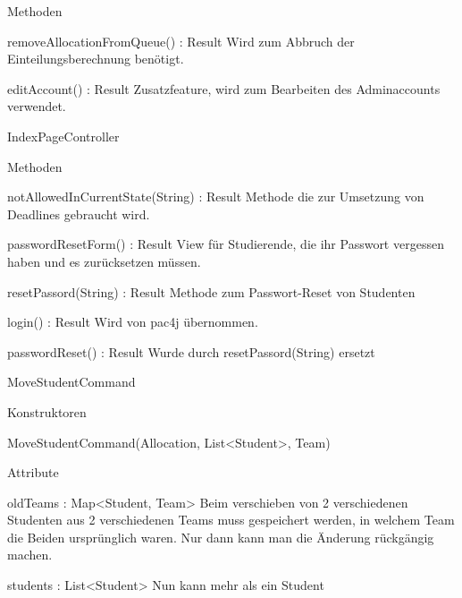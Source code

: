\documentclass[parskip=full]{scrartcl}
\newcommand{\changeDescription}[1]{{\newline\color{black}\normalfont #1}}
\newcommand{\code}[1]{{\ttfamily #1}}
\begin{document}
\begin{itemPackage}
\begin{itemClass}
\begin{itemClassSub}
\item Methoden
\begin{itemPlus}
\item removeAllocationFromQueue() : Result \changeDescription{Wird zum Abbruch
der Einteilungsberechnung benötigt.}
\item editAccount() : Result \changeDescription{Zusatzfeature, wird zum
Bearbeiten des Adminaccounts verwendet.}
\end{itemPlus}
\end{itemClassSub}
\item IndexPageController
\item \begin{itemClassSub}
\item Methoden
\begin{itemPlus}
\item notAllowedInCurrentState(String) : Result \changeDescription{Methode die
zur Umsetzung von Deadlines gebraucht wird.}
\item passwordResetForm() : Result \changeDescription{View für Studierende, die
ihr Passwort vergessen haben und es zurücksetzen müssen.}
\item resetPassord(String) : Result \changeDescription{Methode zum
Passwort-Reset von Studenten}
\end{itemPlus}
\begin{itemMinus}
\item login() : Result \changeDescription{Wird von \code{pac4j} übernommen.}
\item passwordReset() : Result \changeDescription{Wurde durch
\code{resetPassord(String)} ersetzt}
\end{itemMinus}
\end{itemClassSub}
\item MoveStudentCommand
\begin{itemClassSub}
\item Konstruktoren
\begin{itemPlus}
\item MoveStudentCommand(Allocation, List<Student>, Team)
\end{itemPlus}
\item Attribute
\begin{itemPlus}
\item oldTeams : Map<Student, Team> \changeDescription{Beim verschieben von 2
verschiedenen Studenten aus 2 verschiedenen Teams muss gespeichert werden, in
welchem Team die Beiden ursprünglich waren. Nur dann kann man die Änderung
rückgängig machen.}
\item students : List<Student> \changeDescription{Nun kann mehr als ein Student
}
\end{itemPlus}
\end{itemClassSub}
\end{itemClass}
\end{itemPackage}
\end{document}

